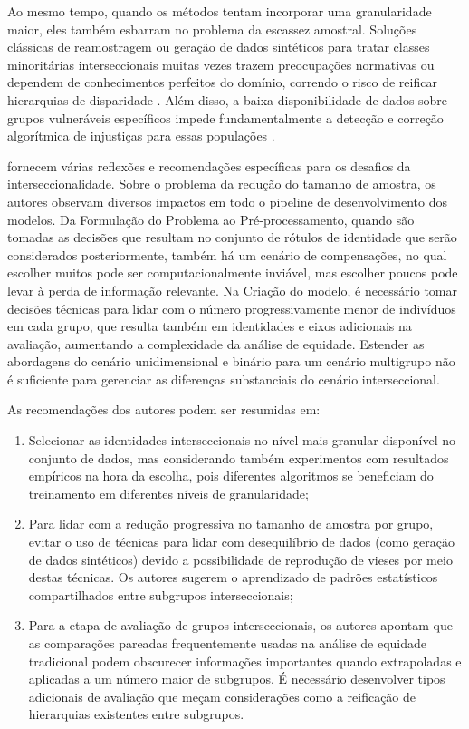 Ao mesmo tempo, quando os métodos tentam incorporar uma granularidade maior, eles também esbarram no problema da escassez amostral. Soluções clássicas de reamostragem ou geração de dados sintéticos para tratar classes minoritárias interseccionais muitas vezes trazem preocupações normativas ou dependem de conhecimentos perfeitos do domínio, correndo o risco de reificar hierarquias de disparidade \cite{wang2022towards}. Além disso, a baixa disponibilidade de dados sobre grupos vulneráveis específicos impede fundamentalmente a detecção e correção algorítmica de injustiças para essas populações \cite{delaney2024oxonfair}.

\citet{wang2022towards} fornecem várias reflexões e recomendações específicas para os desafios da interseccionalidade. Sobre o problema da redução do tamanho de amostra, os autores observam diversos impactos em todo o pipeline de desenvolvimento dos modelos. Da Formulação do Problema ao Pré-processamento, quando são tomadas as decisões que resultam no conjunto de rótulos de identidade que serão considerados posteriormente, também há um cenário de compensações, no qual escolher muitos pode ser  computacionalmente inviável, mas escolher poucos pode levar à perda de informação relevante. Na Criação do modelo, é necessário tomar decisões técnicas para lidar com o número progressivamente menor de indivíduos em cada grupo, que resulta também em identidades e eixos adicionais na avaliação, aumentando a complexidade da análise de equidade. Estender as abordagens do cenário unidimensional e binário para um cenário multigrupo não é suficiente para gerenciar as diferenças substanciais do cenário interseccional.

As recomendações dos autores podem ser resumidas em:
\begin{enumerate}
    \item Selecionar as identidades interseccionais no nível mais granular disponível no conjunto de dados, mas considerando também experimentos com resultados empíricos na hora da escolha, pois diferentes algoritmos se beneficiam do treinamento em diferentes níveis de granularidade;
    \item Para lidar com a redução progressiva no tamanho de amostra por grupo, evitar o uso de técnicas para lidar com desequilíbrio de dados (como geração de dados sintéticos) devido a possibilidade de reprodução de vieses por meio destas técnicas. Os autores sugerem o aprendizado de padrões estatísticos compartilhados entre subgrupos interseccionais;
    \item Para a etapa de avaliação de grupos interseccionais, os autores apontam que as comparações pareadas frequentemente usadas na análise de equidade tradicional podem obscurecer informações importantes quando extrapoladas e aplicadas a um número maior de subgrupos. É necessário desenvolver tipos adicionais de avaliação que meçam considerações como a reificação de hierarquias existentes entre subgrupos.
\end{enumerate}

